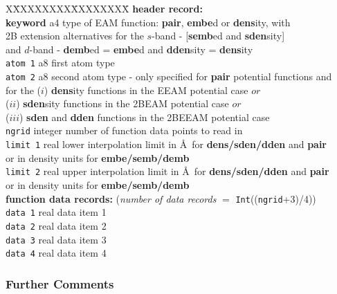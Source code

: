 \begin{tabbing}
X\=XXXXXXXX\=XXXXXXXX\=\kill
{\bf header record:} \\
\> {\bf keyword} \> a4      \> type of EAM function: {\bf pair}, {\bf embe}d or {\bf dens}ity, with \\
\>               \>         \> 2B extension alternatives for the $s$-band - [{\bf semb}ed and {\bf sden}sity] \\
\>               \>         \> and $d$-band - {\bf demb}ed = {\bf embe}d and {\bf dden}sity = {\bf dens}ity \\
\> {\tt atom 1}  \> a8      \> first atom type \\
\> {\tt atom 2}  \> a8      \> second atom type - only specified for {\bf pair} potential functions and \\
\>               \>         \> for the ($i$) {\bf dens}ity functions in the EEAM potential case $or$ \\
\>               \>         \> ($ii$) {\bf sden}sity functions in the 2BEAM potential case $or$ \\
\>               \>         \> ($iii$) {\bf sden} and {\bf dden} functions in the 2BEEAM potential case \\
\> {\tt ngrid}   \> integer \> number of function data points to read in \\
\> {\tt limit 1} \> real    \> lower interpolation limit in \AA~for {\bf dens/sden/dden} and {\bf pair} \\
\>               \>         \> or in density units for {\bf embe/semb/demb} \\
\> {\tt limit 2} \> real    \> upper interpolation limit in \AA~for {\bf dens/sden/dden} and {\bf pair} \\
\>               \>         \> or in density units for {\bf embe/semb/demb} \\
{\bf function data records:} ({\em number of data records} $=$ {\tt Int}(({\tt ngrid}+3)/4)) \\
\> {\tt data 1}  \> real    \> data item 1 \\
\> {\tt data 2}  \> real    \> data item 2 \\
\> {\tt data 3}  \> real    \> data item 3 \\
\> {\tt data 4}  \> real    \> data item 4
\end{tabbing}

\subsubsection{Further Comments}

